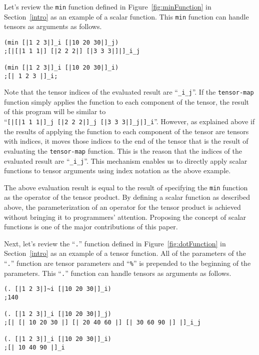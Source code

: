 \documentclass[acmlarge]{acmart}
\begin{document}
Let's review the \texttt{min} function defined in Figure~\ref{fig:minFunction} in Section~\ref{intro} as an example of a scalar function.
This \texttt{min} function can handle tensors as arguments as follows.

{\footnotesize
\begin{verbatim}
(min [|1 2 3|]_i [|10 20 30|]_j)
;[|[|1 1 1|] [|2 2 2|] [|3 3 3|]|]_i_j

(min [|1 2 3|]_i [|10 20 30|]_i)
;[| 1 2 3 |]_i;
\end{verbatim}
}

Note that the tensor indices of the evaluated result are ``\verb|_i_j|''.
If the \texttt{tensor-map} function simply applies the function to each component of the tensor, the result of this program will be similar to \\
``\verb![|[|1 1 1|]_j [|2 2 2|]_j [|3 3 3|]_j|]_i!''.
However, as explained above if the results of applying the function to each component of the tensor are tensors with indices, it moves those indices to the end of the tensor that is the result of evaluating the \texttt{tensor-map} function.
This is the reason that the indices of the evaluated result are ``\verb|_i_j|''.
This mechanism enables us to directly apply scalar functions to tensor arguments using index notation as the above example.

The above evaluation result is equal to the result of specifying the \texttt{min} function as the operator of the tensor product.
By defining a scalar function as described above, the parameterization of an operator for the tensor product is achieved without bringing it to programmers' attention.
Proposing the concept of scalar functions is one of the major contributions of this paper.

Next, let's review the ``\texttt{.}'' function defined in Figure~\ref{fig:dotFunction} in Section~\ref{intro} as an example of a tensor function.
All of the parameters of the ``\texttt{.}'' function are tensor parameters and ``\texttt{\%}'' is prepended to the beginning of the parameters.
This ``\texttt{.}'' function can handle tensors as arguments as follows.

{\footnotesize
\begin{verbatim}
(. [|1 2 3|]~i [|10 20 30|]_i)
;140

(. [|1 2 3|]_i [|10 20 30|]_j)
;[| [| 10 20 30 |] [| 20 40 60 |] [| 30 60 90 |] |]_i_j

(. [|1 2 3|]_i [|10 20 30|]_i)
;[| 10 40 90 |]_i
\end{verbatim}
}
\end{document}
